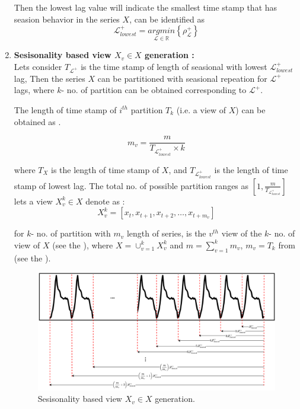 \documentclass[a4paper, fleqn]{cas-sc}
\theoremstyle{definition}
\theoremstyle{remark}
\begin{document}
\begin{enumerate}[label=(\alph*)]
Then the lowest lag value will indicate the smallest time stamp that has seasion behavior in the series $X$,  can be identified as
\begin{equation} \label{lxl}
  \mathscr{L}_{lowest}^+ = \underset{\mathscr{L} \in \mathbb{R}}{arg min} \left\{\rho_{\mathscr{L}}^+  \right\}
\end{equation}



\item \textbf{Sesisonality based view $X_v \in X$ generation :  } \\
Lets consider $T_{\mathscr{L} ^+}$ is the time stamp of length of seasional with lowest $\mathscr{L}_{lowest}^+$ lag,  Then the series $X$ can be partitioned with seasional repeation for $\mathscr{L}^+$ lags,  where $k$- no. of partition can be obtained corresponding to $\mathscr{L}^+$.

The length of time stamp of $i^{th}$ partition $T_k$ (i.e. a view of $X$) can be obtained as .

\begin{equation} \label{vvtk}
  m_v=\frac{m}{T_{ \mathscr{L}_{lowest}^+ }\times k}
\end{equation}

where $T_X$ is the length of time stamp of $X$,  and $T_{ \mathscr{L}_{lowest}^+ }$ is the length of time stamp of lowest lag.
The total no. of possible partition ranges as $\left[1,  \frac{m}{T_{\mathscr{L}_{lowest}^+ }} \right]$
lets a view $X_v^k \in X$ denote as : 
\begin{equation} \label{vi g}
  X_v^k = [x_t, x_{t+1}, x_{t+2},  \dots , x_{t+m_v}]
\end{equation}

 for $k$- no. of partition with $m_v$ length of series,  is the $v^{th}$ view of the $k$- no. of view of $X$ (see the  ),  where $X=\cup_{v=1}^k {X_v^k}$ and $m= \sum_{v=1}^{k} m_v$,  $m_v = T_k$ from  (see the ).

 \begin{figure}\label{view gen}
  \centering
  \includegraphics[scale=.6]{se_view}
  \caption{Sesisonality based view $X_v \in X$ generation.}
 \end{figure}



\end{enumerate}
\end{document}
